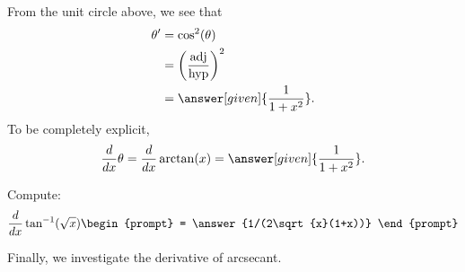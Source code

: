 \documentclass{ximera}
\begin{document}
\begin{theorem}
\begin{explanation}
\begin{image}
\end{image}
From the unit circle above, we see that 
\begin{align*}
  \theta' &= \cos^2(\theta)\\
  &= \left(\frac{\mathrm{adj}}{\mathrm{hyp}}\right)^2\\
  &= \answer[given]{\frac{1}{1+x^2}}.
\end{align*}
To be completely explicit, 
\[
\ddx \theta = \ddx \arctan(x) = \answer[given]{\frac{1}{1+x^2}}.
\]
\end{explanation}
\end{theorem}

\begin{question}
  Compute:
  \[
  \ddx \tan^{-1}(\sqrt{x})
  \begin{prompt}
    = \answer{1/(2\sqrt{x}(1+x))}
  \end{prompt}
  \]
\end{question}



Finally, we investigate the derivative of arcsecant.
\end{document}
